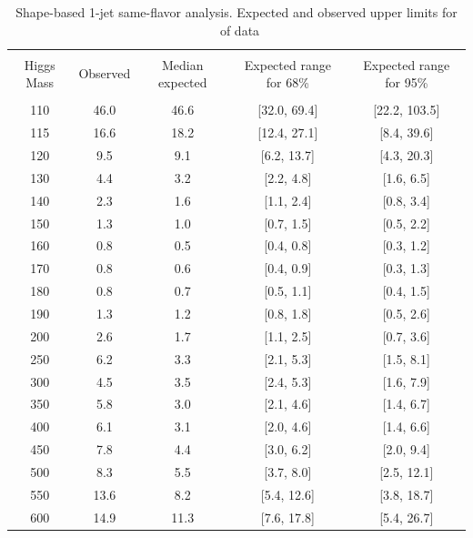 \begin{table}[!hbp]
\begin{center}
\begin{tabular}{c c c c c}
\hline
\vspace{-3mm} && \\
 Higgs Mass   & Observed & Median expected & Expected range for 68\% & Expected range for 95\%   \\
\vspace{-3mm} && \\
\hline
110 & 46.0 & 46.6 & [32.0, 69.4] & [22.2, 103.5] \\
115 & 16.6 & 18.2 & [12.4, 27.1] & [8.4, 39.6] \\
120 & 9.5 & 9.1 & [6.2, 13.7] & [4.3, 20.3] \\
130 & 4.4 & 3.2 & [2.2, 4.8] & [1.6, 6.5] \\
140 & 2.3 & 1.6 & [1.1, 2.4] & [0.8, 3.4] \\
150 & 1.3 & 1.0 & [0.7, 1.5] & [0.5, 2.2] \\
160 & 0.8 & 0.5 & [0.4, 0.8] & [0.3, 1.2] \\
170 & 0.8 & 0.6 & [0.4, 0.9] & [0.3, 1.3] \\
180 & 0.8 & 0.7 & [0.5, 1.1] & [0.4, 1.5] \\
190 & 1.3 & 1.2 & [0.8, 1.8] & [0.5, 2.6] \\
200 & 2.6 & 1.7 & [1.1, 2.5] & [0.7, 3.6] \\
250 & 6.2 & 3.3 & [2.1, 5.3] & [1.5, 8.1] \\
300 & 4.5 & 3.5 & [2.4, 5.3] & [1.6, 7.9] \\
350 & 5.8 & 3.0 & [2.1, 4.6] & [1.4, 6.7] \\
400 & 6.1 & 3.1 & [2.0, 4.6] & [1.4, 6.6] \\
450 & 7.8 & 4.4 & [3.0, 6.2] & [2.0, 9.4] \\
500 & 8.3 & 5.5 & [3.7, 8.0] & [2.5, 12.1] \\
550 & 13.6 & 8.2 & [5.4, 12.6] & [3.8, 18.7] \\
600 & 14.9 & 11.3 & [7.6, 17.8] & [5.4, 26.7] \\
\hline
\end{tabular}
\caption{Shape-based 1-jet same-flavor analysis. Expected and observed
  upper limits for \intlumi\ of data}
\label{tab:sf0_cut}
\end{center}
\end{table}

